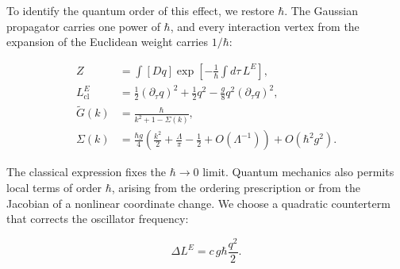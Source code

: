 To identify the quantum order of this effect, we restore $\hbar$. The Gaussian
propagator carries one power of $\hbar$, and every interaction vertex from the
expansion of the Euclidean weight carries $1/\hbar$:

\begin{equation}
 \begin{aligned}
 Z&=\int[Dq]\exp\left[-\frac{1}{\hbar}\int d\tau\,L^E\right],\\
 L^E_{\mathrm{cl}}&=\frac{1}{2}(\partial_\tau q)^2+\frac{1}{2}q^2
 -\frac{g}{8}q^2(\partial_\tau q)^2,\\
 \widetilde G(k)&=\frac{\hbar}{k^2+1-\Sigma(k)},\\
 \Sigma(k)&=\frac{\hbar g}{4}
 \left(\frac{k^2}{2}+\frac{\Lambda}{\pi}-\frac{1}{2}
 +O(\Lambda^{-1})\right)+O(\hbar^2g^2).
 \end{aligned}
 \label{eq:253a-restored-hbar}
\end{equation}

The classical expression fixes the $\hbar\to0$ limit. Quantum mechanics also
permits local terms of order $\hbar$, arising from the ordering prescription
or from the Jacobian of a nonlinear coordinate change. We choose a quadratic
counterterm that corrects the oscillator frequency:

\begin{equation}
 \Delta L^E=c\,g\hbar\frac{q^2}{2}.
 \label{eq:253a-quadratic-counterterm}
\end{equation}

